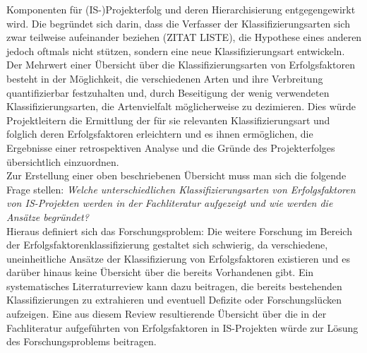 Komponenten für (IS-)Projekterfolg und deren Hierarchisierung entgegengewirkt wird. Die begründet sich 
darin, dass die Verfasser der Klassifizierungsarten sich zwar teilweise aufeinander beziehen (ZITAT LISTE), die 
Hypothese eines anderen jedoch oftmals nicht stützen, sondern eine neue Klassifizierungsart entwickeln.\\\noindent
Der Mehrwert einer Übersicht über die Klassifizierungsarten von Erfolgsfaktoren besteht in der Möglichkeit, 
die verschiedenen Arten und ihre Verbreitung quantifizierbar festzuhalten und, durch Beseitigung der wenig verwendeten 
Klassifizierungsarten, die Artenvielfalt möglicherweise zu dezimieren. Dies würde Projektleitern die Ermittlung der für 
sie relevanten Klassifizierungsart und folglich deren Erfolgsfaktoren erleichtern und es ihnen ermöglichen, die Ergebnisse einer 
retrospektiven Analyse und die Gründe des Projekterfolges übersichtlich einzuordnen.
\\Zur Erstellung einer oben beschriebenen Übersicht muss man sich die folgende Frage stellen:
\textit{Welche unterschiedlichen Klassifizierungsarten von Erfolgsfaktoren von IS-Projekten werden in der Fachliteratur aufgezeigt und wie werden die Ansätze begründet?}\\
Hieraus definiert sich das Forschungsproblem:
Die weitere Forschung im Bereich der Erfolgsfaktorenklassifizierung gestaltet sich schwierig, da
verschiedene, uneinheitliche Ansätze der Klassifizierung von Erfolgsfaktoren existieren und es darüber hinaus keine Übersicht über die bereits  Vorhandenen gibt.
Ein systematisches Literraturreview kann dazu beitragen, die bereits bestehenden Klassifizierungen zu extrahieren 
und eventuell Defizite oder Forschungslücken aufzeigen.
Eine aus diesem Review resultierende Übersicht über die in der Fachliteratur aufgeführten \KAS von 
Erfolgsfaktoren in IS-Projekten würde zur Lösung des Forschungsproblems beitragen.